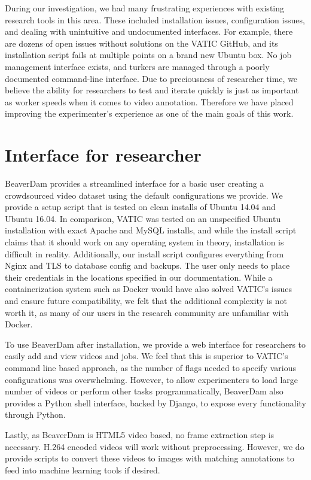 
During our investigation, we had many frustrating experiences with existing research tools in this area.
These included installation issues, configuration issues, and dealing with unintuitive and undocumented interfaces.
For example, there are dozens of open issues without solutions on the VATIC GitHub,
and its installation script fails at multiple points on a brand new Ubuntu box.
No job management interface exists, and turkers are managed through a poorly documented command-line interface.
Due to preciousness of researcher time,
we believe the ability for researchers to test and iterate quickly is just as important as worker speeds when it comes to video annotation.
Therefore we have placed improving the experimenter's experience as one of the main goals of this work.

\section{Interface for researcher}

BeaverDam provides a streamlined interface for a basic user creating a crowdsourced video dataset using the default configurations we provide.
We provide a setup script that is tested on clean installs of Ubuntu 14.04 and Ubuntu 16.04.
In comparison, VATIC was tested on an unspecified Ubuntu installation with exact Apache and MySQL installs,
and while the install script claims that it should work on any operating system in theory,
installation is difficult in reality.
Additionally, our install script configures everything from Nginx and TLS to database config and backups.
The user only needs to place their credentials in the locations specified in our documentation.
While a containerization system such as Docker would have also solved VATIC's issues and ensure future compatibility,
we felt that the additional complexity is not worth it, as many of our users in the research community are unfamiliar with Docker.

To use BeaverDam after installation, we provide a web interface for researchers to easily add and view videos and jobs.
We feel that this is superior to VATIC's command line based approach,
as the number of flags needed to specify various configurations was overwhelming.
However, to allow experimenters to load large number of videos or perform other tasks programmatically,
BeaverDam also provides a Python shell interface, backed by Django, to expose every functionality through Python.

Lastly, as BeaverDam is HTML5 video based, no frame extraction step is necessary.
H.264 encoded videos will work without preprocessing.
However, we do provide scripts to convert these videos to images with matching annotations to feed into machine learning tools if desired.


